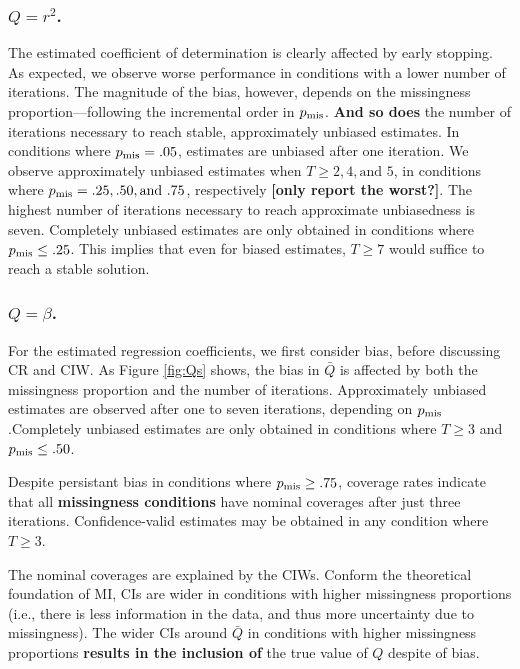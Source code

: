 \documentclass[Royal,times,sageh]{sagej}
\begin{document}
\hypertarget{qr2.}{%
\subsubsection{\texorpdfstring{\(Q=r^2\).}{Q=r\^{}2.}}\label{qr2.}}

The estimated coefficient of determination is clearly affected by early stopping. As expected, we observe worse performance in conditions with a lower number of iterations. The magnitude of the bias, however, depends on the missingness proportion---following the incremental order in \(p_{\rm mis}\). \textbf{And so does} the number of iterations necessary to reach stable, approximately unbiased estimates. In conditions where \(p_{\rm mis}=.05\), estimates are unbiased after one iteration. We observe approximately unbiased estimates when \(T\geq 2,4, \text{and }5\), in conditions where \(p_{\rm mis} = .25, .50, \text{and }.75\), respectively \textbf{{[}only report the worst?{]}}. The highest number of iterations necessary to reach approximate unbiasedness is seven. Completely unbiased estimates are only obtained in conditions where \(p_{\rm mis}\leq.25\). This implies that even for biased estimates, \(T\geq7\) would suffice to reach a stable solution.

\hypertarget{qbeta.}{%
\subsubsection{\texorpdfstring{\(Q=\beta\).}{Q=\textbackslash beta.}}\label{qbeta.}}

For the estimated regression coefficients, we first consider bias, before discussing CR and CIW. As Figure \ref{fig:Qs} shows, the bias in \(\bar{Q}\) is affected by both the missingness proportion and the number of iterations. Approximately unbiased estimates are observed after one to seven iterations, depending on \(p_{\rm mis}\).Completely unbiased estimates are only obtained in conditions where \(T\geq3\) and \(p_{\rm mis}\leq .50\).

Despite persistant bias in conditions where \(p_{\rm mis}\geq.75\), coverage rates indicate that all \textbf{missingness conditions} have nominal coverages after just three iterations. Confidence-valid estimates may be obtained in any condition where \(T\geq3\).

The nominal coverages are explained by the CIWs. Conform the theoretical foundation of MI, CIs are wider in conditions with higher missingness proportions (i.e., there is less information in the data, and thus more uncertainty due to missingness). The wider CIs around \(\bar{Q}\) in conditions with higher missingness proportions \textbf{results in the inclusion of} the true value of \(Q\) despite of bias.
\end{document}

